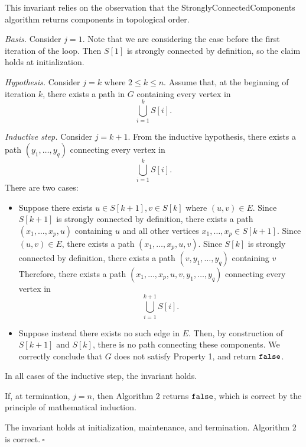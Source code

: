 \begin{enumerate}
\begin{solution}
This invariant relies on the observation that the {\sc StronglyConnectedComponents} algorithm returns components in topological order.

\textit{Basis. }Consider $j=1$. Note that we are considering the case before the first iteration of the loop. Then $S[1]$ is strongly connected by definition, so the claim holds at initialization.

\textit{Hypothesis. }Consider $j=k$ where $2\leq k\leq n$. Assume that, at the beginning of iteration $k$, there exists a path in $G$ containing every vertex in \[\bigcup_{i=1}^kS[i].\]

\textit{Inductive step. }Consider $j=k+1$. From the inductive hypothesis, there exists a path $(y_1,\dots,y_q)$ connecting every vertex in \[\bigcup_{i=1}^kS[i].\] There are two cases:

\begin{itemize}
\item Suppose there exists $u\in S[k+1],v\in S[k]$ where $(u,v)\in E$. Since $S[k+1]$ is strongly connected by definition, there exists a path $(x_1,\dots,x_p,u)$ containing $u$ and all other vertices $x_1,\dots,x_p\in S[k+1]$. Since $(u,v)\in E$, there exists a path $(x_1,\dots,x_p,u,v)$. Since $S[k]$ is strongly connected by definition, there exists a path $(v,y_1,\dots,y_q)$ containing $v$  Therefore, there exists a path $(x_1,\dots,x_p,u,v,y_1,\dots,y_q)$ connecting every vertex in
\[\bigcup_{i=1}^{k+1}S[i].\]
\item Suppose instead there exists no such edge in $E$. Then, by construction of $S[k+1]$ and $S[k]$, there is no path connecting these components. We correctly conclude that $G$ does not satisfy Property 1, and return $\verb|false|$. 
\end{itemize}
In all cases of the inductive step, the invariant holds.

If, at termination, $j=n$, then Algorithm 2 returns $\verb|false|$, which is correct by the principle of mathematical induction.

The invariant holds at initialization, maintenance, and termination. Algorithm 2 is correct.$~\square$
\end{solution}
\end{enumerate}
\newpage

